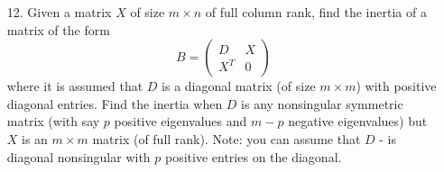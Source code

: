 \documentclass[11pt]{article}
\begin{document}
\begin{enumerate}
	\item[12.] Given a matrix \(X\) of size \(m \times n\) of full column rank, find the inertia of a matrix of the form
		\[B = \begin{pmatrix} D & X \\ X^T & 0 \end{pmatrix}\]
		where it is assumed that \(D\) is a diagonal matrix (of size \(m \times m\)) with positive diagonal entries.  Find the inertia when \(D\) is any nonsingular symmetric matrix (with say \(p\) positive eigenvalues and \(m-p\) negative eigenvalues) but \(X\) is an \(m \times m\) matrix (of full rank). Note: you can assume that \(D\) - is diagonal nonsingular with \(p\) positive entries on the diagonal.
\end{enumerate}
\end{document}
